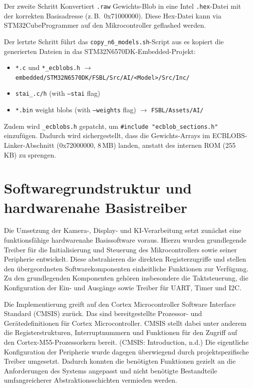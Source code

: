 Der zweite Schritt Konvertiert \texttt{.raw} Gewichts-Blob in eine Intel \texttt{.hex}-Datei mit der korrekten Basisadresse (z.\,B.\ 0x71000000). Diese Hex-Datei kann via STM32CubeProgrammer auf den Mikrocontroller geflashed werden.

Der lertzte Schritt führt das \texttt{copy\_n6\_models.sh}-Script aus es kopiert die generierten Dateien in das STM32N6570DK-Embedded-Projekt:
\begin{itemize}
    \item \texttt{*.c} und \texttt{*\_ecblobs.h} $\rightarrow$ \texttt{embedded/STM32N6570DK/FSBL/Src/AI/\textless Model\textgreater/Src/Inc/}
    \item \texttt{stai\_\*.c/h} (with \texttt{--stai} flag)
    \item \texttt{*.bin} weight blobs (with \texttt{--weights} flag) $\rightarrow$ \texttt{FSBL/Assets/AI/}
\end{itemize}

Zudem wird \texttt{\*\_ecblobs.h} gepatcht, um \verb|#include "ecblob_sections.h"| einzufügen. Dadurch wird sichergestellt, dass die Gewichts-Arrays im ECBLOBS-Linker-Abschnitt (0x72000000, 8\,MB) landen, anstatt des internen ROM (255\,KB) zu sprengen.

\section{Softwaregrundstruktur und hardwarenahe Basistreiber}

Die Umsetzung der Kamera-, Display- und KI-Verarbeitung setzt zunächst eine funktionsfähige hardwarenahe Basissoftware voraus. Hierzu wurden grundlegende Treiber für die Initialisierung und Steuerung des Mikrocontrollers sowie seiner Peripherie entwickelt. Diese abstrahieren die direkten Registerzugriffe und stellen den übergeordneten Softwarekomponenten einheitliche Funktionen zur Verfügung. Zu den grundlegenden Komponenten gehören insbesondere die Taktsteuerung, die Konfiguration der Ein- und Ausgänge sowie Treiber für UART, Timer und I2C.

Die Implementierung greift auf den Cortex Microcontroller Software Interface Standard (CMSIS) zurück. Das sind bereitgestellte Prozessor- und Gerätedefinitionen für Cortex Microcontroller. CMSIS stellt dabei unter anderem die Registerstrukturen, Interruptnummern und Funktionen für den Zugriff auf den Cortex-M55-Prozessorkern bereit.  (CMSIS: Introduction, n.d.) Die eigentliche Konfiguration der Peripherie wurde dagegen überwiegend durch projektspezifische Treiber umgesetzt. Dadurch konnten die benötigten Funktionen gezielt an die Anforderungen des Systems angepasst und nicht benötigte Bestandteile umfangreicherer Abstraktionsschichten vermieden werden.

